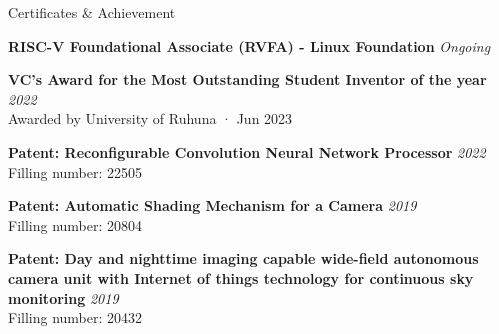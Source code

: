 \documentclass[
	11pt, %
]{./assets/resume} %
\begin{document}
\begin{rSection}{Certificates \& Achievement}
	
	\textbf{RISC-V Foundational Associate (RVFA) - Linux Foundation} \hfill \textit{Ongoing}

	\textbf{VC's Award for the Most Outstanding Student Inventor of the year} \hfill \textit{2022} \\
	Awarded by University of Ruhuna · Jun 2023

	\textbf{Patent: Reconfigurable Convolution Neural Network Processor} \hfill \textit{2022} \\ 
	Filling number: 22505

	\textbf{Patent: Automatic Shading Mechanism for a Camera} \hfill \textit{2019} \\ 
	Filling number: 20804

	\textbf{Patent: Day and nighttime imaging capable wide-field autonomous camera unit with Internet of things technology for continuous sky monitoring} \hfill \textit{2019} \\ 
	Filling number: 20432


\end{rSection}










\end{document}
